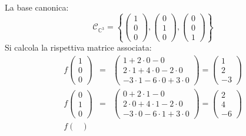 \documentclass[a4paper]{article}
\begin{document}
	\noindent
	La base canonica:
	\begin{equation*}
		\mathcal{C}_{\mathbb{C}^{3}} = \left\{ \begin{pmatrix} 1 \\ 0 \\ 0 \end{pmatrix}, \begin{pmatrix} 0 \\ 1 \\ 0 \end{pmatrix}, \begin{pmatrix} 0 \\ 0 \\ 1 \end{pmatrix}\right\}
	\end{equation*}
	Si calcola la rispettiva matrice associata:
	\begin{equation*}
		\begin{array}{rll}
			f\begin{pmatrix}
				1 \\ 0 \\ 0
			\end{pmatrix} &=& \begin{pmatrix}
				1 + 2 \cdot 0 - 0 \\
				2 \cdot 1 + 4 \cdot 0 - 2 \cdot 0 \\
				-3 \cdot 1 - 6 \cdot 0 + 3 \cdot 0
			\end{pmatrix} = \begin{pmatrix}
				1 \\
				2 \\
				-3
			\end{pmatrix} \\ [2em]
			f\begin{pmatrix}
				0 \\ 1 \\ 0
			\end{pmatrix} &=& \begin{pmatrix}
				0 + 2 \cdot 1 - 0 \\
				2 \cdot 0 + 4 \cdot 1 - 2 \cdot 0 \\
				-3 \cdot 0 - 6 \cdot 1 + 3 \cdot 0
			\end{pmatrix} = \begin{pmatrix}
				2 \\
				4 \\
				-6
			\end{pmatrix} \\ [2em]
			f\begin{pmatrix}

\end{pmatrix}
\end{array}
\end{equation*}
\end{document}

